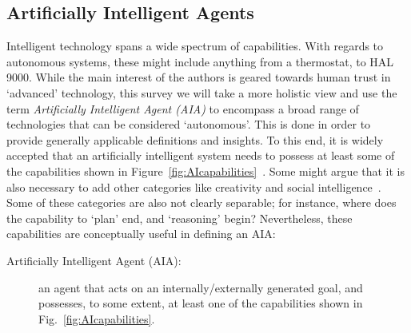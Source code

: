 \subsection{Artificially Intelligent Agents} \label{sec:aias}
    Intelligent technology spans a wide spectrum of capabilities. With regards to autonomous systems, these might include anything from a thermostat, to HAL 9000. While the main interest of the authors is geared towards human trust in `advanced' technology, this survey we will take a more holistic view and use the term \textit{Artificially Intelligent Agent (AIA)} to encompass a broad range of technologies that can be considered `autonomous'. This is done in order to provide generally applicable definitions and insights. 
%
To this end, it is widely accepted that an artificially intelligent system needs to possess at least some of the capabilities shown in Figure~\ref{fig:AIcapabilities}~\cite{Russell2010-wv,Nilsson2009-rp,Luger2008-vf}. Some might argue that it is also necessary to add other categories like creativity and social intelligence~\cite{Duch2007-oi,Tao2005-kh}. 
Some of these categories are also not clearly separable; for instance, where does the capability to `plan' end, and `reasoning' begin? 
Nevertheless, these capabilities are conceptually useful in defining an AIA:     
    \begin{description}
        \item[Artificially Intelligent Agent (AIA):] an agent that acts on an internally/externally generated goal, and possesses, to some extent, at least one of the capabilities shown in Fig.~\ref{fig:AIcapabilities}.
    \end{description}

